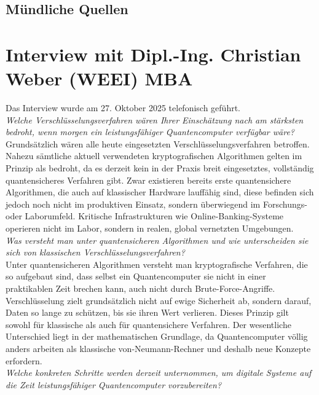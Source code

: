 \pagebreak
\subsection{Mündliche Quellen}

\section*{Interview mit Dipl.-Ing. Christian Weber (WEEI) MBA}
Das Interview wurde am 27. Oktober 2025 telefonisch geführt.\vspace{1em}\\
\textit{Welche Verschlüsselungsverfahren wären Ihrer Einschätzung nach am stärksten bedroht, 
wenn morgen ein leistungsfähiger Quantencomputer verfügbar wäre?}\\
Grundsätzlich wären alle heute eingesetzten Verschlüsselungsverfahren betroffen. 
Nahezu sämtliche aktuell verwendeten kryptografischen Algorithmen gelten im Prinzip als bedroht, 
da es derzeit kein in der Praxis breit eingesetztes, vollständig quantensicheres Verfahren gibt. 
Zwar existieren bereits erste quantensichere Algorithmen, die auch auf klassischer Hardware lauffähig sind, 
diese befinden sich jedoch noch nicht im produktiven Einsatz, sondern überwiegend im Forschungs- 
oder Laborumfeld. Kritische Infrastrukturen wie Online-Banking-Systeme operieren nicht im Labor, 
sondern in realen, global vernetzten Umgebungen.
\vspace{1em}
\\
\hypertarget{pqc_security}{}\textit{Was versteht man unter quantensicheren Algorithmen und wie unterscheiden sie sich von 
klassischen Verschlüsselungsverfahren?}\\
Unter quantensicheren Algorithmen versteht man kryptografische Verfahren, die so aufgebaut sind, 
dass selbst ein Quantencomputer sie nicht in einer praktikablen Zeit brechen kann, auch nicht durch 
Brute-Force-Angriffe. Verschlüsselung zielt grundsätzlich nicht auf ewige Sicherheit ab, sondern darauf, 
Daten so lange zu schützen, bis sie ihren Wert verlieren. Dieses Prinzip gilt sowohl für klassische 
als auch für quantensichere Verfahren. Der wesentliche Unterschied liegt in der mathematischen Grundlage, 
da Quantencomputer völlig anders arbeiten als klassische von-Neumann-Rechner und deshalb neue Konzepte 
erfordern.
\vspace{1em}
\\
\hypertarget{pqc_migration}{}\textit{Welche konkreten Schritte werden derzeit unternommen, um digitale Systeme auf die Zeit 
leistungsfähiger Quantencomputer vorzubereiten?}\\
